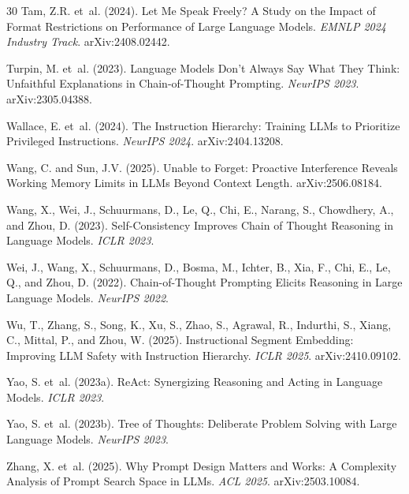 \documentclass[11pt]{article}
\begin{document}
\begin{thebibliography}{30}
Tam, Z.R. et~al. (2024).
\newblock Let Me Speak Freely? A Study on the Impact of Format Restrictions on Performance of Large Language Models.
\newblock \textit{EMNLP 2024 Industry Track}. arXiv:2408.02442.

Turpin, M. et~al. (2023).
\newblock Language Models Don't Always Say What They Think: Unfaithful Explanations in Chain-of-Thought Prompting.
\newblock \textit{NeurIPS 2023}. arXiv:2305.04388.

Wallace, E. et~al. (2024).
\newblock The Instruction Hierarchy: Training LLMs to Prioritize Privileged Instructions.
\newblock \textit{NeurIPS 2024}. arXiv:2404.13208.

Wang, C. and Sun, J.V. (2025).
\newblock Unable to Forget: Proactive Interference Reveals Working Memory Limits in LLMs Beyond Context Length.
\newblock arXiv:2506.08184.

Wang, X., Wei, J., Schuurmans, D., Le, Q., Chi, E., Narang, S., Chowdhery, A., and Zhou, D. (2023).
\newblock Self-Consistency Improves Chain of Thought Reasoning in Language Models.
\newblock \textit{ICLR 2023}.

Wei, J., Wang, X., Schuurmans, D., Bosma, M., Ichter, B., Xia, F., Chi, E., Le, Q., and Zhou, D. (2022).
\newblock Chain-of-Thought Prompting Elicits Reasoning in Large Language Models.
\newblock \textit{NeurIPS 2022}.

Wu, T., Zhang, S., Song, K., Xu, S., Zhao, S., Agrawal, R., Indurthi, S., Xiang, C., Mittal, P., and Zhou, W. (2025).
\newblock Instructional Segment Embedding: Improving LLM Safety with Instruction Hierarchy.
\newblock \textit{ICLR 2025}. arXiv:2410.09102.

Yao, S. et~al. (2023a).
\newblock ReAct: Synergizing Reasoning and Acting in Language Models.
\newblock \textit{ICLR 2023}.

Yao, S. et~al. (2023b).
\newblock Tree of Thoughts: Deliberate Problem Solving with Large Language Models.
\newblock \textit{NeurIPS 2023}.

Zhang, X. et~al. (2025).
\newblock Why Prompt Design Matters and Works: A Complexity Analysis of Prompt Search Space in LLMs.
\newblock \textit{ACL 2025}. arXiv:2503.10084.

\end{thebibliography}
\end{document}

